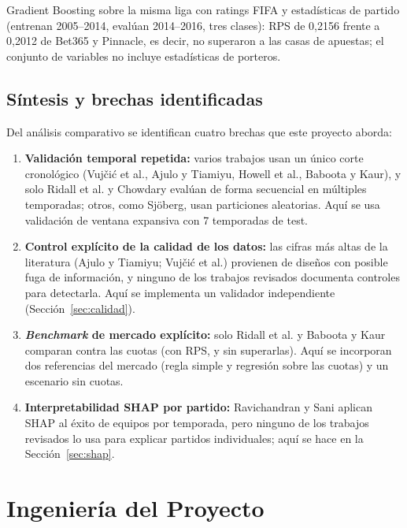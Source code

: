 \documentclass{ieeeaccess}
\begin{document}
Gradient Boosting sobre la misma liga con ratings FIFA y estadísticas de partido (entrenan 2005--2014, evalúan 2014--2016, tres clases): RPS de 0,2156 frente a 0,2012 de Bet365 y Pinnacle, es decir, no superaron a las casas de apuestas; el conjunto de variables no incluye estadísticas de porteros.

\subsection{Síntesis y brechas identificadas}
Del análisis comparativo se identifican cuatro brechas que este proyecto aborda:
\begin{enumerate}
\item \textbf{Validación temporal repetida:} varios trabajos usan un único corte cronológico (Vujčić et al., Ajulo y Tiamiyu, Howell et al., Baboota y Kaur), y solo Ridall et al. y Chowdary evalúan de forma secuencial en múltiples temporadas; otros, como Sjöberg, usan particiones aleatorias. Aquí se usa validación de ventana expansiva con 7 temporadas de test.
\item \textbf{Control explícito de la calidad de los datos:} las cifras más altas de la literatura (Ajulo y Tiamiyu; Vujčić et al.) provienen de diseños con posible fuga de información, y ninguno de los trabajos revisados documenta controles para detectarla. Aquí se implementa un validador independiente (Sección~\ref{sec:calidad}).
\item \textbf{\textit{Benchmark} de mercado explícito:} solo Ridall et al. y Baboota y Kaur comparan contra las cuotas (con RPS, y sin superarlas). Aquí se incorporan dos referencias del mercado (regla simple y regresión sobre las cuotas) y un escenario sin cuotas.
\item \textbf{Interpretabilidad SHAP por partido:} Ravichandran y Sani aplican SHAP al éxito de equipos por temporada, pero ninguno de los trabajos revisados lo usa para explicar partidos individuales; aquí se hace en la Sección~\ref{sec:shap}.
\end{enumerate}

\section{Ingeniería del Proyecto}
\label{sec:ingenieria}
\end{document}
